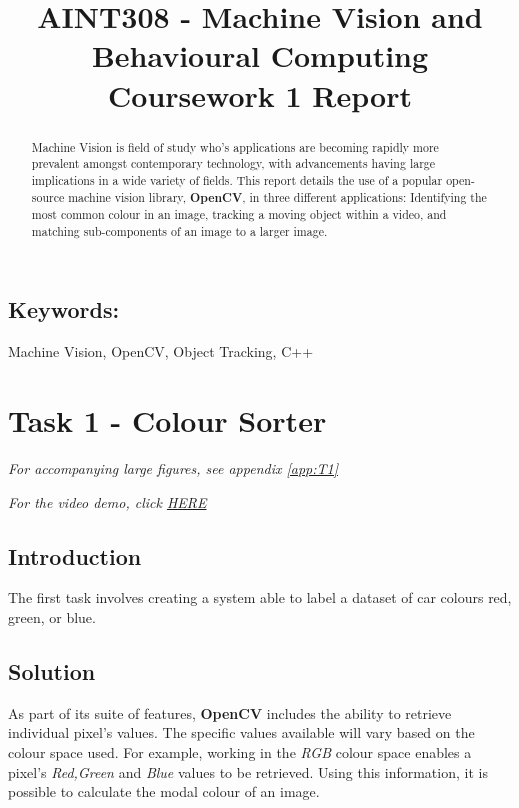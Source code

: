 \documentclass[conference]{IEEEtran}
\begin{document}
%
\title{AINT308 - Machine Vision and Behavioural Computing\\Coursework 1 Report}


\author{
}



\maketitle


\begin{abstract}
 Machine Vision is field of study who's applications are becoming rapidly more prevalent amongst contemporary technology, with advancements having large implications in a wide variety of fields. This report details the use of a popular open-source machine vision library, \textbf{OpenCV}, in three different applications: Identifying the most common colour in an image, tracking a moving object within a video, and matching sub-components of an image to a larger image.
\end{abstract}
\subsection*{Keywords:}
Machine Vision, OpenCV, Object Tracking, C++

\section{Task 1 - Colour Sorter}
\textit{For accompanying large figures, see appendix \ref{app:T1}}

\textit{For the video demo, click \href{https://youtu.be/kQwU62_2fdQ}{HERE}}
\subsection{Introduction}
The first task involves creating a system able to label a dataset of car colours red, green, or blue.
\subsection{Solution}
As part of its suite of features, \textbf{OpenCV} includes the ability to retrieve individual pixel's values. The specific values available will vary based on the colour space used. For example, working in the \textit{RGB} colour space enables a pixel's \textit{Red,Green} and \textit{Blue} values to be retrieved. Using this information, it is possible to calculate the modal colour of an image. 
\end{document}
